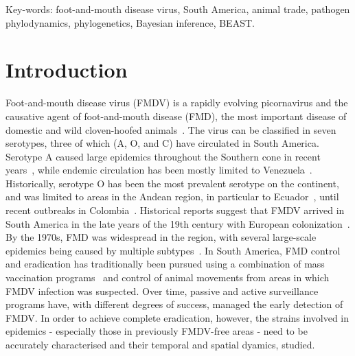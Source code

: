 \documentclass[10pt]{article}
\begin{document}
Key-words: foot-and-mouth disease virus, South America, animal trade, pathogen phylodynamics, phylogenetics, Bayesian inference, BEAST.

\section*{Introduction}

Foot-and-mouth disease virus (FMDV) is a rapidly evolving picornavirus and the causative agent of foot-and-mouth disease (FMD), the most important disease of domestic and wild cloven-hoofed animals~\citep{Grubman2004}.
The virus can be classified in seven serotypes, three of which (A, O, and C) have circulated in South America.
Serotype A caused large epidemics throughout the Southern cone in recent years~\citep{Perez2001, Malirat2012}, while endemic circulation has been mostly limited to Venezuela~\citep{Malirat2012}.
Historically, serotype O has been the most prevalent serotype on the continent, and was limited to areas in the Andean region, in particular to Ecuador~\citep{Malirat2011}, until recent outbreaks in Colombia~\citep{OIE2017, OIE2018}.
Historical reports suggest that FMDV arrived in South America in the late years of the 19th century with European colonization~\citep{Naranjo2013, Tully2008}. 
By the 1970s, FMD was widespread in the region, with several large-scale epidemics being caused by multiple subtypes~\citep{Saraiva2003}.
In South America, FMD control and eradication has traditionally been pursued using a combination of mass vaccination programs~\citep{Saraiva2004b} and control of animal movements from areas in which FMDV infection was suspected.
Over time, passive and active surveillance programs have, with different degrees of success, managed the early detection of FMDV.
In order to achieve complete eradication, however, the strains involved in epidemics - especially those in previously FMDV-free areas - need to be accurately characterised and their temporal and spatial dyamics, studied.
\end{document}
